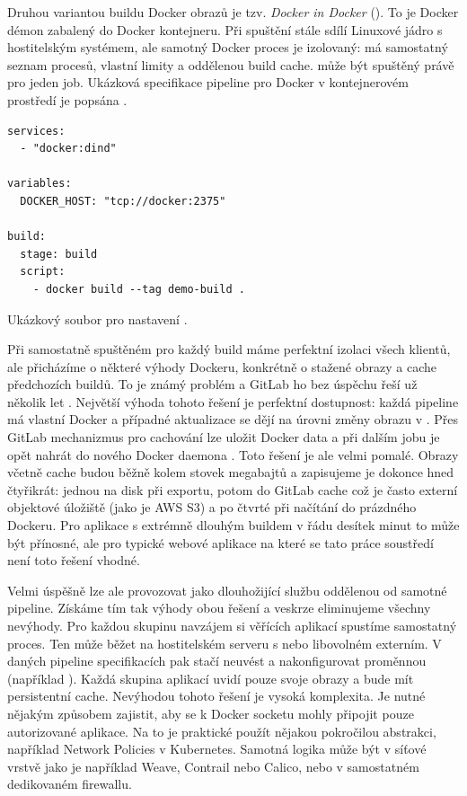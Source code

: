         Druhou variantou buildu Docker obrazů je tzv. \textit{Docker in Docker} (). To je Docker démon zabalený do Docker kontejneru. Při spuštění stále sdílí Linuxové jádro s hostitelským systémem, ale samotný Docker proces je izolovaný: má samostatný seznam procesů, vlastní limity a oddělenou build cache.  může být spuštěný právě pro jeden job. Ukázková specifikace pipeline pro Docker v kontejnerovém prostředí je popsána .

        \begin{iffigure}
            \begin{verbatim}
services:
  - "docker:dind"

variables:
  DOCKER_HOST: "tcp://docker:2375"

build:
  stage: build
  script:
    - docker build --tag demo-build .
            \end{verbatim}
            \caption{Ukázkový soubor  pro nastavení .}
            \label{fig:gitlab-dind}
        \end{iffigure}

        Při samostatně spuštěném  pro každý build máme perfektní izolaci všech klientů, ale přicházíme o některé výhody Dockeru, konkrétně o stažené obrazy a cache předchozích buildů. To je známý problém a GitLab ho bez úspěchu řeší už několik let \cite{gitlab-docker-artifact-caching}. Největší výhoda tohoto řešení je perfektní dostupnost: každá pipeline má vlastní Docker a případné aktualizace se dějí na úrovni změny obrazu v . Přes GitLab mechanizmus pro cachování lze uložit Docker data a při dalším jobu je opět nahrát do nového Docker daemona \cite{patel-docker-cache}. Toto řešení je ale velmi pomalé. Obrazy včetně cache budou běžně kolem stovek megabajtů a zapisujeme je dokonce hned čtyřikrát: jednou na disk při exportu, potom do GitLab cache což je často externí objektové úložiště (jako je AWS S3) a po čtvrté při načítání do prázdného Dockeru. Pro aplikace s extrémně dlouhým buildem v řádu desítek minut to může být přínosné, ale pro typické webové aplikace na které se tato práce soustředí není toto řešení vhodné.

        Velmi úspěšně lze ale  provozovat jako dlouhožijící službu oddělenou od samotné \CI pipeline. Získáme tím tak výhody obou řešení a veskrze eliminujeme všechny nevýhody. Pro každou skupinu navzájem si věřících aplikací spustíme samostatný  proces. Ten může běžet na hostitelském serveru s \CI nebo libovolném externím. V daných pipeline specifikacích pak stačí neuvést  a nakonfigurovat proměnnou  (například ). Každá skupina aplikací uvidí pouze svoje obrazy a bude mít persistentní cache. Nevýhodou tohoto řešení je vysoká komplexita. Je nutné nějakým způsobem zajistit, aby se k Docker socketu mohly připojit pouze autorizované aplikace. Na to je praktické použít nějakou pokročilou abstrakci, například Network Policies v Kubernetes. Samotná  logika může být v síťové vrstvě jako je například Weave, Contrail nebo Calico, nebo v samostatném dedikovaném firewallu.

